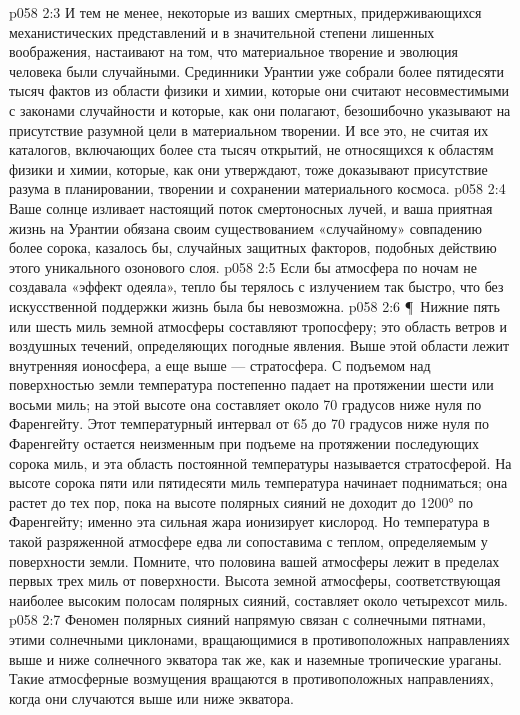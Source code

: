 \vs p058 2:3 И тем не менее, некоторые из ваших смертных, придерживающихся механистических представлений и в значительной степени лишенных воображения, настаивают на том, что материальное творение и эволюция человека были случайными. Срединники Урантии уже собрали более пятидесяти тысяч фактов из области физики и химии, которые они считают несовместимыми с законами случайности и которые, как они полагают, безошибочно указывают на присутствие разумной цели в материальном творении. И все это, не считая их каталогов, включающих более ста тысяч открытий, не относящихся к областям физики и химии, которые, как они утверждают, тоже доказывают присутствие разума в планировании, творении и сохранении материального космоса.
\vs p058 2:4 Ваше солнце изливает настоящий поток смертоносных лучей, и ваша приятная жизнь на Урантии обязана своим существованием «случайному» совпадению более сорока, казалось бы, случайных защитных факторов, подобных действию этого уникального озонового слоя.
\vs p058 2:5 Если бы атмосфера по ночам не создавала «эффект одеяла», тепло бы терялось с излучением так быстро, что без искусственной поддержки жизнь была бы невозможна.
\vs p058 2:6 \P\ Нижние пять или шесть миль земной атмосферы составляют тропосферу; это область ветров и воздушных течений, определяющих погодные явления. Выше этой области лежит внутренняя ионосфера, а еще выше --- стратосфера. С подъемом над поверхностью земли температура постепенно падает на протяжении шести или восьми миль; на этой высоте она составляет около 70 градусов ниже нуля по Фаренгейту. Этот температурный интервал от 65 до 70 градусов ниже нуля по Фаренгейту остается неизменным при подъеме на протяжении последующих сорока миль, и эта область постоянной температуры называется стратосферой. На высоте сорока пяти или пятидесяти миль температура начинает подниматься; она растет до тех пор, пока на высоте полярных сияний не доходит до 1200° по Фаренгейту; именно эта сильная жара ионизирует кислород. Но температура в такой разряженной атмосфере едва ли сопоставима с теплом, определяемым у поверхности земли. Помните, что половина вашей атмосферы лежит в пределах первых трех миль от поверхности. Высота земной атмосферы, соответствующая наиболее высоким полосам полярных сияний, составляет около четырехсот миль.
\vs p058 2:7 Феномен полярных сияний напрямую связан с солнечными пятнами, этими солнечными циклонами, вращающимися в противоположных направлениях выше и ниже солнечного экватора так же, как и наземные тропические ураганы. Такие атмосферные возмущения вращаются в противоположных направлениях, когда они случаются выше или ниже экватора.
